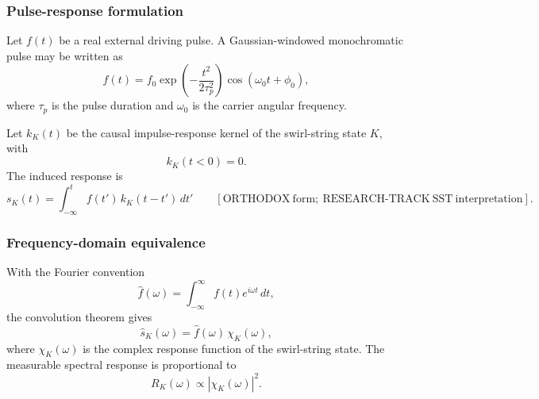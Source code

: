     \subsubsection*{Pulse-response formulation}
        
        Let \(f(t)\) be a real external driving pulse. A Gaussian-windowed monochromatic pulse may be written as
        \begin{equation}
            f(t)
            =
            f_0
            \exp\!\left(-\frac{t^2}{2\tau_p^2}\right)
            \cos(\omega_0 t+\phi_0),
            \label{eq:gaussian_drive_pulse}
        \end{equation}
        where \(\tau_p\) is the pulse duration and \(\omega_0\) is the carrier angular frequency.
        
        Let \(k_K(t)\) be the causal impulse-response kernel of the swirl-string state \(K\), with
        \begin{equation}
            k_K(t<0)=0.
        \end{equation}
        The induced response is
        \begin{equation}
            \boxed{
                s_K(t)
                =
                \int_{-\infty}^{t}
                f(t')\,k_K(t-t')\,dt'
            }
            \qquad
            [\mathrm{ORTHODOX\ form;\ RESEARCH\text{-}TRACK\ SST\ interpretation}].
            \label{eq:SST_convolution_response}
        \end{equation}
    
    \subsubsection*{Frequency-domain equivalence}
        
        With the Fourier convention
        \[
            \hat f(\omega)
            =
            \int_{-\infty}^{\infty}
            f(t)e^{i\omega t}\,dt,
        \]
        the convolution theorem gives
        \begin{equation}
            \hat s_K(\omega)
            =
            \hat f(\omega)\,\chi_K(\omega),
            \label{eq:frequency_response_chi}
        \end{equation}
        where \(\chi_K(\omega)\) is the complex response function of the swirl-string state. The measurable spectral response is proportional to
        \begin{equation}
            R_K(\omega)
            \propto
            |\chi_K(\omega)|^2.
            \label{eq:response_modulus}
        \end{equation}
    
